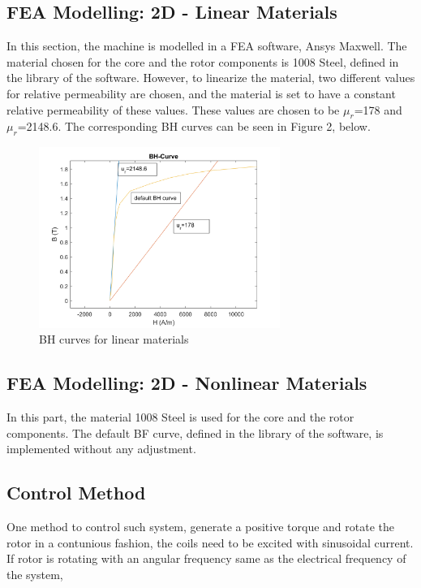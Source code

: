 \documentclass[a4paper, 11pt]{article}
\begin{document}
\subsection{FEA Modelling: 2D - Linear Materials}
In this section, the machine is modelled in a FEA software, Ansys Maxwell. The material chosen for the core and the rotor components is 1008 Steel, defined in the library of the software. However, to linearize the material, two different values for relative permeability are chosen, and the material is set to have a constant relative permeability of these values. These values are chosen to be $\mu_r$=178 and $\mu_r$=2148.6. The corresponding BH curves can be seen in Figure 2, below.
\begin{figure}[h!]
\centering
\includegraphics[width=0.7\textwidth]{BH.png}
\caption{BH curves for linear materials}
\end{figure}




\subsection{FEA Modelling: 2D - Nonlinear Materials}
In this part, the material 1008 Steel is used for the core and the rotor components. The default BF curve, defined in the library of the software, is implemented without any adjustment.

\subsection{Control Method}

One method to control such system, generate a positive torque and rotate the rotor in a contunious fashion, the coils need to be excited with sinusoidal current.
If rotor is rotating with an angular frequency same as the electrical frequency of the system,
\end{document}
